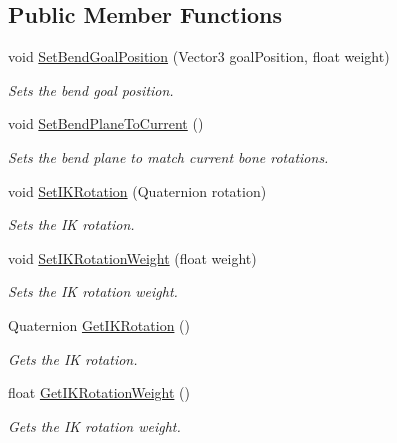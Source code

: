 \subsection*{Public Member Functions}
\begin{DoxyCompactItemize}
\item 
void \mbox{\hyperlink{class_root_motion_1_1_final_i_k_1_1_i_k_solver_trigonometric_a6bd7bbb083517bec97b07e880677b7d0}{Set\+Bend\+Goal\+Position}} (Vector3 goal\+Position, float weight)
\begin{DoxyCompactList}\small\item\em Sets the bend goal position. \end{DoxyCompactList}\item 
void \mbox{\hyperlink{class_root_motion_1_1_final_i_k_1_1_i_k_solver_trigonometric_a34b97c919411075aa9b85283f035a3ef}{Set\+Bend\+Plane\+To\+Current}} ()
\begin{DoxyCompactList}\small\item\em Sets the bend plane to match current bone rotations. \end{DoxyCompactList}\item 
void \mbox{\hyperlink{class_root_motion_1_1_final_i_k_1_1_i_k_solver_trigonometric_ac46bbda2f611739b743693bd597a3ac3}{Set\+I\+K\+Rotation}} (Quaternion rotation)
\begin{DoxyCompactList}\small\item\em Sets the IK rotation. \end{DoxyCompactList}\item 
void \mbox{\hyperlink{class_root_motion_1_1_final_i_k_1_1_i_k_solver_trigonometric_ad57e0a8f7e350f2bd7d64ed97b2f5e05}{Set\+I\+K\+Rotation\+Weight}} (float weight)
\begin{DoxyCompactList}\small\item\em Sets the IK rotation weight. \end{DoxyCompactList}\item 
Quaternion \mbox{\hyperlink{class_root_motion_1_1_final_i_k_1_1_i_k_solver_trigonometric_a00f5cefedcbca7be6dbcded3f7bfcc8d}{Get\+I\+K\+Rotation}} ()
\begin{DoxyCompactList}\small\item\em Gets the IK rotation. \end{DoxyCompactList}\item 
float \mbox{\hyperlink{class_root_motion_1_1_final_i_k_1_1_i_k_solver_trigonometric_ac44b6e1e845e324c9a4b2ffb7d7cc4b0}{Get\+I\+K\+Rotation\+Weight}} ()
\begin{DoxyCompactList}\small\item\em Gets the IK rotation weight. \end{DoxyCompactList}\item 

\end{DoxyCompactItemize}
